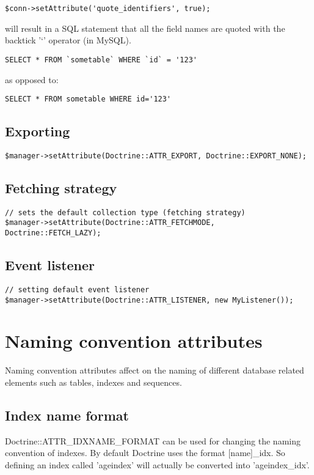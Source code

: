 \documentclass[11pt,a4paper]{report}
\begin{document}
\begin{verbatim}
$conn->setAttribute('quote_identifiers', true);
\end{verbatim}

will result in a SQL statement that all the field names are quoted with the backtick '`' operator (in MySQL).

\begin{verbatim}
SELECT * FROM `sometable` WHERE `id` = '123'
\end{verbatim}

as opposed to:

\begin{verbatim}
SELECT * FROM sometable WHERE id='123'
\end{verbatim}

\subsection{Exporting}
\begin{verbatim}
$manager->setAttribute(Doctrine::ATTR_EXPORT, Doctrine::EXPORT_NONE);
\end{verbatim}

\subsection{Fetching strategy}
\begin{verbatim}
// sets the default collection type (fetching strategy)
$manager->setAttribute(Doctrine::ATTR_FETCHMODE, Doctrine::FETCH_LAZY);
\end{verbatim}

\subsection{Event listener}
\begin{verbatim}
// setting default event listener
$manager->setAttribute(Doctrine::ATTR_LISTENER, new MyListener());
\end{verbatim}

\section{Naming convention attributes}
Naming convention attributes affect on the naming of different database related elements such as tables, indexes and sequences.

\subsection{Index name format}
Doctrine::ATTR\_IDXNAME\_FORMAT can be used for changing the naming convention of indexes. By default Doctrine uses the format [name]\_idx. So defining an index called 'ageindex' will actually be converted into 'ageindex\_idx'.
\end{document}
